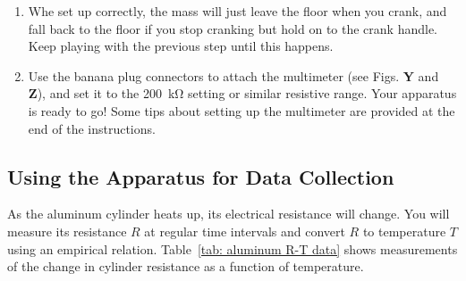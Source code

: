 \documentclass[addpoints]{physlabs}
\begin{document}
\begin{labsection}
\begin{experiment}
\begin{enumerate}
    \item Whe set up correctly, the mass will just leave the floor when you crank, and fall back to the floor if you stop cranking but hold on to the crank handle. Keep playing with the previous step until this happens.
    \item Use the banana plug connectors to attach the multimeter (see Figs. {\bf Y} and {\bf Z}), and set it to the \qty{200}{\kilo\ohm} setting or similar resistive range. Your apparatus is ready to go! Some tips about setting up the multimeter are provided at the end of the instructions.
\end{enumerate}

\subsection*{Using the Apparatus for Data Collection}

As the aluminum cylinder heats up, its electrical resistance will change. You will measure its resistance $R$ at regular time intervals and convert $R$ to temperature $T$ using an empirical relation. Table~\ref{tab: aluminum R-T data} shows measurements of the change in cylinder resistance as a function of temperature.


\end{experiment}
\end{labsection}
\end{document}
